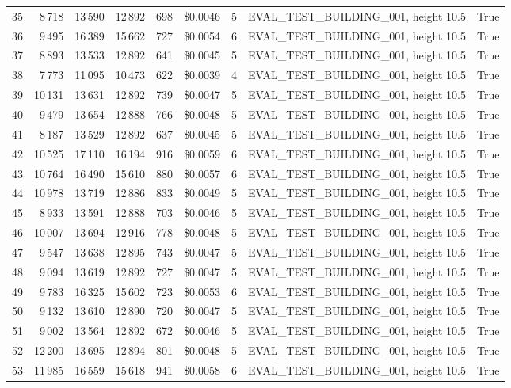 \documentclass[a4paper,11pt]{article}
\begin{document}
\begin{table}[ht]
\begin{tabular}{r r r r r r r p{3cm} l}
35 & 8\,718 & 13\,590 & 12\,892 & 698 & \$0.0046 & 5 & EVAL\_TEST\_BUILDING\_001, height 10.5 & True \\
36 & 9\,495 & 16\,389 & 15\,662 & 727 & \$0.0054 & 6 & EVAL\_TEST\_BUILDING\_001, height 10.5 & True \\
37 & 8\,893 & 13\,533 & 12\,892 & 641 & \$0.0045 & 5 & EVAL\_TEST\_BUILDING\_001, height 10.5 & True \\
38 & 7\,773 & 11\,095 & 10\,473 & 622 & \$0.0039 & 4 & EVAL\_TEST\_BUILDING\_001, height 10.5 & True \\
39 & 10\,131 & 13\,631 & 12\,892 & 739 & \$0.0047 & 5 & EVAL\_TEST\_BUILDING\_001, height 10.5 & True \\
40 & 9\,479 & 13\,654 & 12\,888 & 766 & \$0.0048 & 5 & EVAL\_TEST\_BUILDING\_001, height 10.5 & True \\
41 & 8\,187 & 13\,529 & 12\,892 & 637 & \$0.0045 & 5 & EVAL\_TEST\_BUILDING\_001, height 10.5 & True \\
42 & 10\,525 & 17\,110 & 16\,194 & 916 & \$0.0059 & 6 & EVAL\_TEST\_BUILDING\_001, height 10.5 & True \\
43 & 10\,764 & 16\,490 & 15\,610 & 880 & \$0.0057 & 6 & EVAL\_TEST\_BUILDING\_001, height 10.5 & True \\
44 & 10\,978 & 13\,719 & 12\,886 & 833 & \$0.0049 & 5 & EVAL\_TEST\_BUILDING\_001, height 10.5 & True \\
45 & 8\,933 & 13\,591 & 12\,888 & 703 & \$0.0046 & 5 & EVAL\_TEST\_BUILDING\_001, height 10.5 & True \\
46 & 10\,007 & 13\,694 & 12\,916 & 778 & \$0.0048 & 5 & EVAL\_TEST\_BUILDING\_001, height 10.5 & True \\
47 & 9\,547 & 13\,638 & 12\,895 & 743 & \$0.0047 & 5 & EVAL\_TEST\_BUILDING\_001, height 10.5 & True \\
48 & 9\,094 & 13\,619 & 12\,892 & 727 & \$0.0047 & 5 & EVAL\_TEST\_BUILDING\_001, height 10.5 & True \\
49 & 9\,783 & 16\,325 & 15\,602 & 723 & \$0.0053 & 6 & EVAL\_TEST\_BUILDING\_001, height 10.5 & True \\
50 & 9\,132 & 13\,610 & 12\,890 & 720 & \$0.0047 & 5 & EVAL\_TEST\_BUILDING\_001, height 10.5 & True \\
51 & 9\,002 & 13\,564 & 12\,892 & 672 & \$0.0046 & 5 & EVAL\_TEST\_BUILDING\_001, height 10.5 & True \\
52 & 12\,200 & 13\,695 & 12\,894 & 801 & \$0.0048 & 5 & EVAL\_TEST\_BUILDING\_001, height 10.5 & True \\
53 & 11\,985 & 16\,559 & 15\,618 & 941 & \$0.0058 & 6 & EVAL\_TEST\_BUILDING\_001, height 10.5 & True \\

\end{tabular}
\end{table}
\end{document}
